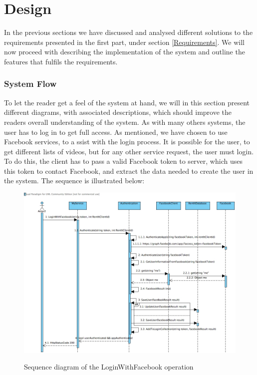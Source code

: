 \part{Design}
In the previous sections we have discussed and analysed different solutions to the requirements presented in the first part, under section \ref{Requirements}. We will now proceed with describing the implementation of the system and outline the features that fulfils the requirements.

\section{System Flow}
To let the reader get a feel of the system at hand, we will in this section present different diagrams, with associated descriptions, which should improve the readers overall understanding of the system.
As with many others systems, the user has to log in to get full access. As mentioned, we have chosen to use Facebook services, to a ssist with the login process. It is possible for the user, to get different lists of videos, but for any other service request, the user must login. To do this, the client has to pass a valid Facebook token to server, which uses this token to contact Facebook, and extract the data needed to create the user in the system. The sequence is illustrated below:

\begin{figure}[H]
\centering
\includegraphics[scale=0.35]{loginWithFacebook.jpg}
\label{loginwithfacebook}
\caption{Sequence diagram of the LoginWithFacebook operation}
\end{figure}


